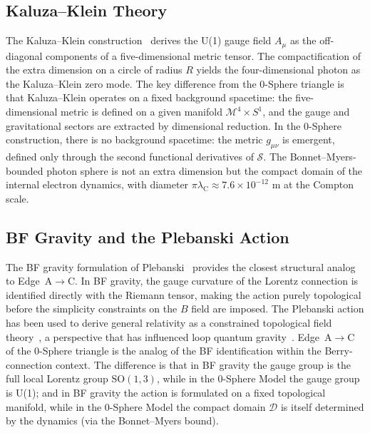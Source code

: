 \documentclass[%
 reprint, amsmath,amssymb, aps, prd, ]{revtex4-2}
\numberwithin{equation}{section}
\newcommand{\lambdaC}{\lambda_{\mathrm{C}}}
\newcommand{\SyngeS}{\mathcal{S}}
\begin{document}
\subsection{Kaluza--Klein Theory}

The Kaluza--Klein construction~\cite{Kaluza1921,Klein1926} derives the U(1) gauge field $A_\mu$ as the off-diagonal components of a five-dimensional metric tensor.
The compactification of the extra dimension on a circle of radius $R$ yields the four-dimensional photon as the Kaluza--Klein zero mode.
The key difference from the 0-Sphere triangle is that Kaluza--Klein operates on a fixed background spacetime: the five-dimensional metric is defined on a given manifold $\mathcal{M}^4 \times S^1$, and the gauge and gravitational sectors are extracted by dimensional reduction.
In the 0-Sphere construction, there is no background spacetime: the metric $g_{\mu\nu}$ is emergent, defined only through the second functional derivatives of $\SyngeS$.
The Bonnet--Myers-bounded photon sphere is not an extra dimension but the compact domain of the internal electron dynamics, with diameter $\pi\lambdaC \approx 7.6 \times 10^{-12}$ m at the Compton scale.

\subsection{BF Gravity and the Plebanski Action}

The BF gravity formulation of Plebanski~\cite{Plebanski1977} provides the closest structural analog to Edge~A$\to$C.
In BF gravity, the gauge curvature of the Lorentz connection is identified directly with the Riemann tensor, making the action purely topological before the simplicity constraints on the $B$ field are imposed.
The Plebanski action has been used to derive general relativity as a constrained topological field theory~\cite{Freidel2005}, a perspective that has influenced loop quantum gravity~\cite{RovelliBook}.
Edge~A$\to$C of the 0-Sphere triangle is the analog of the BF identification within the Berry-connection context.
The difference is that in BF gravity the gauge group is the full local Lorentz group $\mathrm{SO}(1,3)$, while in the 0-Sphere Model the gauge group is U(1); and in BF gravity the action is formulated on a fixed topological manifold, while in the 0-Sphere Model the compact domain $\mathcal{D}$ is itself determined by the dynamics (via the Bonnet--Myers bound).
\end{document}
